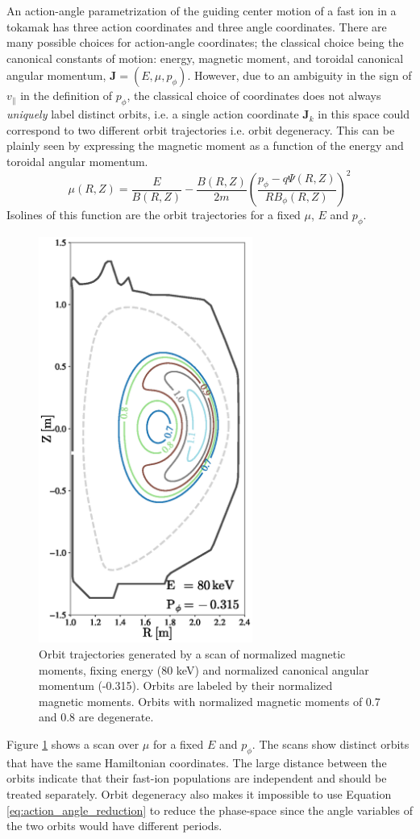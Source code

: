 An action-angle parametrization of the guiding center motion of a fast ion in a tokamak has three action coordinates and three angle coordinates.
There are many possible choices for action-angle coordinates; the classical choice being the canonical constants of motion: energy, magnetic moment, and toroidal canonical angular momentum, $\mathbf{J} = (E,\mu,p_\phi)$.
However, due to an ambiguity in the sign of $v_\parallel$ in the definition of $p_\phi$, the classical choice of coordinates does not always \textit{uniquely} label distinct orbits, i.e. a single action coordinate $ \mathbf{J}_k$ in this space could correspond to two different orbit trajectories i.e. orbit degeneracy. This can be plainly seen by expressing the magnetic moment as a function of the energy and toroidal angular momentum. 
\begin{equation}\label{eq:mu}
\mu(R,Z) = \frac{E}{B(R,Z)} - \frac{B(R,Z)}{2m} \left ( \frac{p_\phi - q\Psi(R,Z)}{RB_\phi(R,Z)}\right)^2
\end{equation}
Isolines of this function are the orbit trajectories for a fixed $\mu$, $E$ and $p_\phi$.
\begin{figure}[h!]
    \centering
    \includegraphics[width=7cm]{figures/hamiltonian_orbits.eps}
    \caption{Orbit trajectories generated by a scan of normalized magnetic moments, fixing energy (80 keV) and normalized canonical angular momentum (-0.315). Orbits are labeled by their normalized magnetic moments. Orbits with normalized magnetic moments of 0.7 and 0.8 are degenerate.}
    \label{fig:hamiltonian_orbits}
\end{figure}
Figure \ref{fig:hamiltonian_orbits} shows a scan over $\mu$ for a fixed $E$ and $p_\phi$. The scans show distinct orbits that have the same Hamiltonian coordinates.
The large distance between the orbits indicate that their fast-ion populations are independent and should be treated separately.
Orbit degeneracy also makes it impossible to use Equation \ref{eq:action_angle_reduction} to reduce the phase-space since the angle variables of the two orbits would have different periods.


